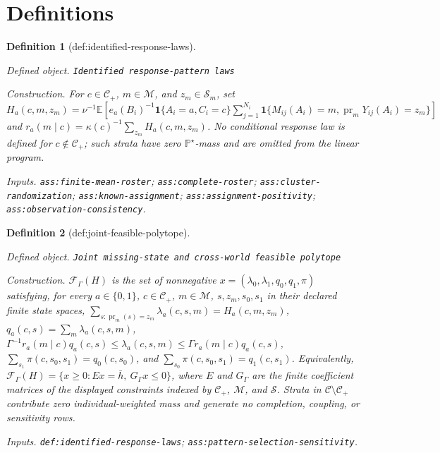 \documentclass{article}
\newtheorem{definition}{Definition}
\begin{document}
\section{Definitions}

\begin{definition}[def:identified-response-laws]\label{def:identified-response-laws}
\par\smallskip\noindent\emph{Defined object.} \texttt{Identified response-\allowbreak{}pattern laws}
\par\smallskip\noindent\emph{Construction.} For \(c\in\mathcal C_{+}\), \(m\in\mathcal M\), and \(z_m\in\mathcal S_m\), set \(H_a(c,m,z_m)=\nu^{-1}\mathbb E[e_a(B_i)^{-1}\mathbf 1\{A_i=a,C_i=c\}\sum_{j=1}^{N_i}\mathbf 1\{M_{ij}(A_i)=m,\operatorname{pr}_mY_{ij}(A_i)=z_m\}]\) and \(r_a(m\mid c)=\kappa(c)^{-1}\sum_{z_m}H_a(c,m,z_m)\). No conditional response law is defined for \(c\notin\mathcal C_{+}\); such strata have zero \(\mathbb P^{\star}\)-mass and are omitted from the linear program.
\par\smallskip\noindent\emph{Inputs.} \texttt{ass:\allowbreak{}finite-\allowbreak{}mean-\allowbreak{}roster}; \texttt{ass:\allowbreak{}complete-\allowbreak{}roster}; \texttt{ass:\allowbreak{}cluster-\allowbreak{}randomization}; \texttt{ass:\allowbreak{}known-\allowbreak{}assignment}; \texttt{ass:\allowbreak{}assignment-\allowbreak{}positivity}; \texttt{ass:\allowbreak{}observation-\allowbreak{}consistency}.
\end{definition}

\begin{definition}[def:joint-feasible-polytope]\label{def:joint-feasible-polytope}
\par\smallskip\noindent\emph{Defined object.} \texttt{Joint missing-\allowbreak{}state and cross-\allowbreak{}world feasible polytope}
\par\smallskip\noindent\emph{Construction.} \(\mathcal F_{\Gamma}(H)\) is the set of nonnegative \(x=(\lambda_0,\lambda_1,q_0,q_1,\pi)\) satisfying, for every \(a\in\{0,1\}\), \(c\in\mathcal C_{+}\), \(m\in\mathcal M\), \(s,z_m,s_0,s_1\) in their declared finite state spaces, \(\sum_{s:\operatorname{pr}_m(s)=z_m}\lambda_a(c,s,m)=H_a(c,m,z_m)\), \(q_a(c,s)=\sum_m\lambda_a(c,s,m)\), \(\Gamma^{-1}r_a(m\mid c)q_a(c,s)\le\lambda_a(c,s,m)\le\Gamma r_a(m\mid c)q_a(c,s)\), \(\sum_{s_1}\pi(c,s_0,s_1)=q_0(c,s_0)\), and \(\sum_{s_0}\pi(c,s_0,s_1)=q_1(c,s_1)\). Equivalently, \(\mathcal F_{\Gamma}(H)=\{x\ge0:Ex=\bar h,\ G_{\Gamma}x\le0\}\), where \(E\) and \(G_{\Gamma}\) are the finite coefficient matrices of the displayed constraints indexed by \(\mathcal C_{+}\), \(\mathcal M\), and \(\mathcal S\). Strata in \(\mathcal C\setminus\mathcal C_{+}\) contribute zero individual-weighted mass and generate no completion, coupling, or sensitivity rows.
\par\smallskip\noindent\emph{Inputs.} \texttt{def:\allowbreak{}identified-\allowbreak{}response-\allowbreak{}laws}; \texttt{ass:\allowbreak{}pattern-\allowbreak{}selection-\allowbreak{}sensitivity}.
\end{definition}
\end{document}
